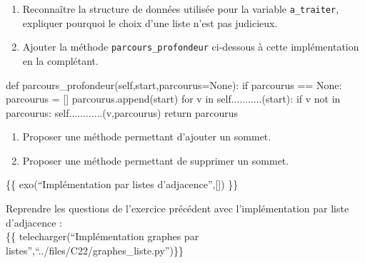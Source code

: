 \documentclass[
  letterpaper,
  DIV=11,
  numbers=noendperiod]{scrartcl}
\newenvironment{Shaded}{\begin{snugshade}}{\end{snugshade}}
\newcommand{\ControlFlowTok}[1]{\textcolor[rgb]{0.00,0.23,0.31}{#1}}
\newcommand{\KeywordTok}[1]{\textcolor[rgb]{0.00,0.23,0.31}{#1}}
\newcommand{\NormalTok}[1]{\textcolor[rgb]{0.00,0.23,0.31}{#1}}
\newcommand{\OperatorTok}[1]{\textcolor[rgb]{0.37,0.37,0.37}{#1}}
\newcommand{\VariableTok}[1]{\textcolor[rgb]{0.07,0.07,0.07}{#1}}
\begin{document}
\begin{enumerate}
\def\labelenumi{\arabic{enumi}.}
\setcounter{enumi}{3}
\item
  Reconnaître la structure de données utilisée pour la variable
  \texttt{a\_traiter}, expliquer pourquoi le choix d'une liste n'est pas
  judicieux.
\item
  Ajouter la méthode \texttt{parcours\_profondeur} ci-dessous à cette
  implémentation en la complétant.
\end{enumerate}

\begin{Shaded}
\begin{Highlighting}[]
\KeywordTok{def}\NormalTok{ parcours\_profondeur(}\VariableTok{self}\NormalTok{,start,parcourus}\OperatorTok{=}\VariableTok{None}\NormalTok{):}
        \ControlFlowTok{if}\NormalTok{ parcourus }\OperatorTok{==} \VariableTok{None}\NormalTok{:}
\NormalTok{            parcourus }\OperatorTok{=}\NormalTok{ []}
\NormalTok{        parcourus.append(start)}
        \ControlFlowTok{for}\NormalTok{ v }\KeywordTok{in} \VariableTok{self}\NormalTok{...........(start):}
            \ControlFlowTok{if}\NormalTok{ v }\KeywordTok{not} \KeywordTok{in}\NormalTok{ parcourus:}
                \VariableTok{self}\NormalTok{............(v,parcourus)}
        \ControlFlowTok{return}\NormalTok{ parcourus}
\end{Highlighting}
\end{Shaded}

\begin{enumerate}
\def\labelenumi{\arabic{enumi}.}
\setcounter{enumi}{5}
\item
  Proposer une méthode permettant d'ajouter un sommet.
\item
  Proposer une méthode permettant de supprimer un sommet.
\end{enumerate}

\{\{ exo(``Implémentation par listes d'adjacence'',{[}{]}) \}\}

Reprendre les questions de l'exercice précédent avec l'implémentation
par liste d'adjacence :\\
\{\{ telecharger(``Implémentation graphes par
listes'',``../files/C22/graphes\_liste.py'')\}\}
\end{document}
